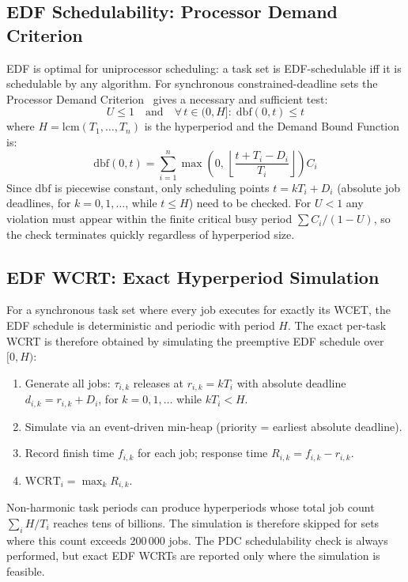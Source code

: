 \documentclass[a4paper,11pt]{article}
\begin{document}
\subsection{EDF Schedulability: Processor Demand Criterion}
\label{sec:edf_sched}

EDF is optimal for uniprocessor scheduling: a task set is EDF-schedulable iff it is
schedulable by any algorithm. For synchronous constrained-deadline sets the Processor
Demand Criterion~\cite{buttazzo2024} gives a necessary and sufficient test:
\begin{equation}
    U \leq 1 \quad \text{and} \quad \forall\, t \in (0, H]:\;
    \mathrm{dbf}(0,t) \leq t
    \label{eq:pdc}
\end{equation}
where $H = \mathrm{lcm}(T_1,\ldots,T_n)$ is the hyperperiod and the Demand Bound Function is:
\begin{equation}
    \mathrm{dbf}(0,t) = \sum_{i=1}^{n} \max\!\left(0,\,
    \left\lfloor \frac{t + T_i - D_i}{T_i} \right\rfloor\right) C_i
\end{equation}
Since $\mathrm{dbf}$ is piecewise constant, only scheduling points
$t = k T_i + D_i$ (absolute job deadlines, for $k = 0, 1, \ldots$, while $t \leq H$) need
to be checked. For $U < 1$ any violation must appear within the finite critical busy period
$\sum C_i / (1 - U)$, so the check terminates quickly regardless of hyperperiod size.

\subsection{EDF WCRT: Exact Hyperperiod Simulation}
\label{sec:edf_wcrt}

For a synchronous task set where every job executes for exactly its WCET, the EDF schedule
is deterministic and periodic with period $H$. The exact per-task WCRT is therefore obtained
by simulating the preemptive EDF schedule over $[0, H)$:
\begin{enumerate}
    \item Generate all jobs: $\tau_{i,k}$ releases at $r_{i,k} = k T_i$ with absolute
          deadline $d_{i,k} = r_{i,k} + D_i$, for $k = 0, 1, \ldots$ while $k T_i < H$.
    \item Simulate via an event-driven min-heap (priority = earliest absolute deadline).
    \item Record finish time $f_{i,k}$ for each job; response time $R_{i,k} = f_{i,k} - r_{i,k}$.
    \item $\mathrm{WCRT}_i = \max_k R_{i,k}$.
\end{enumerate}
Non-harmonic task periods can produce hyperperiods whose total job count
$\sum_i H/T_i$ reaches tens of billions. The simulation is therefore skipped for sets
where this count exceeds 200\,000 jobs. The PDC schedulability check is always performed,
but exact EDF WCRTs are reported only where the simulation is feasible.
\end{document}
